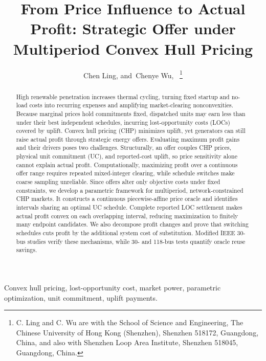 \documentclass[journal]{IEEEtran}
\begin{document}
\title{From Price Influence to Actual Profit: Strategic Offer under Multiperiod Convex Hull Pricing}
\author{Chen Ling, and~Chenye Wu,~%
\thanks{C. Ling and C. Wu are with the School of Science and Engineering, The Chinese University of Hong Kong (Shenzhen), Shenzhen 518172, Guangdong, China, and also with Shenzhen Loop Area Institute, Shenzhen 518045, Guangdong, China.}}
\maketitle

\begin{abstract}
High renewable penetration increases thermal cycling, turning fixed startup and no-load costs into recurring expenses and amplifying market-clearing nonconvexities. Because marginal prices hold commitments fixed, dispatched units may earn less than under their best independent schedules, incurring lost-opportunity costs (LOCs) covered by uplift. Convex hull pricing (CHP) minimizes uplift, yet generators can still raise actual profit through strategic energy offers. Evaluating maximum profit gains and their drivers poses two challenges. Structurally, an offer couples CHP prices, physical unit commitment (UC), and reported-cost uplift, so price sensitivity alone cannot explain actual profit. Computationally, maximizing profit over a continuous offer range requires repeated mixed-integer clearing, while schedule switches make coarse sampling unreliable. Since offers alter only objective costs under fixed constraints, we develop a parametric framework for multiperiod, network-constrained CHP markets. It constructs a continuous piecewise-affine price oracle and identifies intervals sharing an optimal UC schedule. Complete reported LOC settlement makes actual profit convex on each overlapping interval, reducing maximization to finitely many endpoint candidates. We also decompose profit changes and prove that switching schedules cuts profit by the additional system cost of substitution. Modified IEEE 30-bus studies verify these mechanisms, while 30- and 118-bus tests quantify oracle reuse savings.
\end{abstract}

\begin{IEEEkeywords}
Convex hull pricing, lost-opportunity cost, market power, parametric optimization, unit commitment, uplift payments.
\end{IEEEkeywords}

\end{document}
